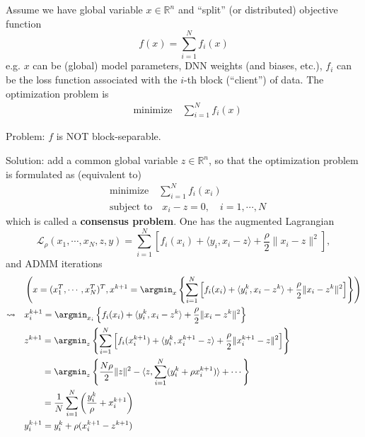 Assume we have global variable $x \in \mathbb{R}^n$ and ``split'' (or distributed) objective function
$$f(x) = \sum\limits_{i=1}^N f_i(x)$$
e.g. $x$ can be (global) model parameters, DNN weights (and biases, etc.), $f_i$ can be the loss function associated with the $i$-th block (``client'') of data. The optimization problem is
\begin{align*}
    & \text{minimize} \quad \sum\limits_{i=1}^N f_i(x)
\end{align*}

Problem: $f$ is NOT block-separable.

Solution: add a common global variable $z \in \mathbb{R}^n$, so that the optimization problem is formulated as (equivalent to)
\begin{align*}
    & \text{minimize} \quad \sum\limits_{i=1}^N f_i(x_i) \\
    & \text{subject to} \quad x_i - z = 0, \quad i=1,\cdots,N
\end{align*}
which is called a {\bfseries consensus problem}. One has the augmented Lagrangian
$$\mathcal{L}_{\rho}(x_1,\cdots,x_N,z,y) = \sum\limits_{i=1}^N \left[ f_i(x_i) + \langle y_i, x_i-z \rangle + \dfrac{\rho}{2} \lVert x_i-z \rVert^2 \right],$$
and ADMM iterations
\begin{align*}
    \phantom{\leadsto} & \left( x = (x_1^T,\cdots,x_N^T)^T, x^{k+1} = \argmin_x \left\{ \sum\limits_{i=1}^N \left[ f_i(x_i) + \langle y^k_i, x_i-z^k \rangle + \dfrac{\rho}{2} \lVert x_i-z^k \rVert^2 \right] \right\} \right) \\
    \leadsto \quad & x_i^{k+1} = \argmin_{x_i} \left\{ f_i(x_i) + \langle y^k_i, x_i-z^k \rangle + \dfrac{\rho}{2} \lVert x_i-z^k \rVert^2 \right\} \\
    & z^{k+1} = \argmin_{z} \left\{ \sum\limits_{i=1}^N \left[ f_i(x_i^{k+1}) + \langle y^k_i, x_i^{k+1}-z \rangle + \dfrac{\rho}{2} \lVert x_i^{k+1}-z \rVert^2 \right] \right\} \\
    & \phantom{z^{k+1}} = \argmin_{z} \left\{ \dfrac{N\rho}{2} \lVert z \rVert^2 - \langle z, \sum\limits_{i=1}^N (y_i^k+\rho x_i^{k+1}) \rangle + \cdots \right\} \\
    & \phantom{z^{k+1}} = \dfrac{1}{N} \sum\limits_{i=1}^N \left( \dfrac{y_i^{k}}{\rho} + x_i^{k+1} \right) \\
    & y_i^{k+1} = y_i^k + \rho (x_i^{k+1} - z^{k+1})
\end{align*}

